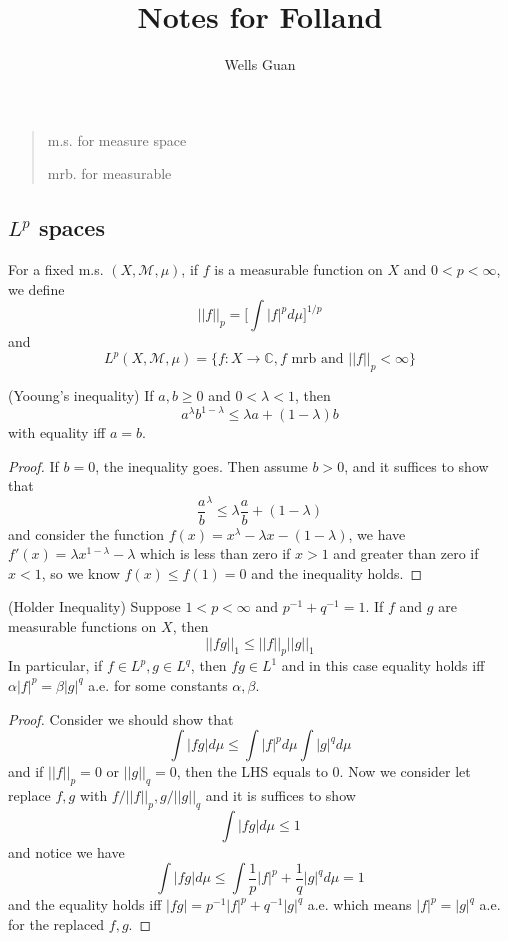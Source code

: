 \documentclass[lang=en, color=blue, ]{elegantbook}
\title{Notes for Folland}
\author{Wells Guan}
\newcommand{\C}{\mathbb{C}}
\newcommand{\M}{\mathcal{M}}
\begin{document}


\chapter{}

\begin{quotation}
m.s. for measure space\par
mrb. for measurable\par
\end{quotation}

\section{$L^p$ spaces}

\begin{definition}
For a fixed m.s. $(X,\M,\mu)$, if $f$ is a measurable function on $X$ and $0<p<\infty$, we define
\[||f||_p = \Big[\int |f|^p d\mu\Big]^{1/p}\]
and
\[L^p(X,\M,\mu) = \{f:X\to\C, f\text{ mrb and }||f||_p < \infty\}\]
\end{definition}

\begin{lemma}
    (Yooung's inequality) If $a,b\geq 0$ and $0<\lambda<1$, then
    \[a^{\lambda}b^{1-\lambda} \leq \lambda a + (1-\lambda)b\]
    with equality iff $a=b$.
\end{lemma}

\begin{proof}\par
    If $b = 0$, the inequality goes. Then assume $b>0$, and it suffices to show that
    \[\dfrac{a}{b}^{\lambda} \leq \lambda \dfrac{a}{b}+(1-\lambda)\]
    and consider the function $f(x) = x^{\lambda}-\lambda x - (1-\lambda)$, we have $f'(x) = \lambda x^{1-\lambda} - \lambda$ which is less than zero if $x>1$ and greater than zero if $x<1$, so we know $f(x) \leq f(1) = 0$ and the inequality holds.
\end{proof}

\begin{theorem}
    (Holder Inequality) Suppose $1<p<\infty$ and $p^{-1}+q^{-1}=1$. If $f$ and $g$ are measurable functions on $X$, then
    \[||fg||_1 \leq ||f||_p||g||_1\]
    In particular, if $f\in L^p, g\in L^q$, then $fg\in L^1$ and in this case equality holds iff $\alpha|f|^p = \beta|g|^q$ a.e. for some constants $\alpha,\beta$.
\end{theorem}
\begin{proof}\par
    Consider we should show that
    \[
    \int |fg| d\mu \leq \int |f|^pd\mu \int |g|^qd\mu
    \]
    and if $||f||_p = 0$ or $||g||_q = 0$, then the LHS equals to $0$. Now we consider let replace $f,g$ with $f/||f||_p, g/||g||_q$ and it is suffices to show
    \[\int |fg| d\mu \leq 1\]
    and notice we have
    \[
    \int |fg|d\mu \leq \int \dfrac{1}{p}|f|^p+\dfrac{1}{q}|g|^q d\mu = 1
    \]
    and the equality holds iff $|fg| = p^{-1}|f|^p+q^{-1}|g|^q$ a.e. which means $|f|^p = |g|^q$ a.e. for the replaced $f,g$.
\end{proof}
\end{document}
